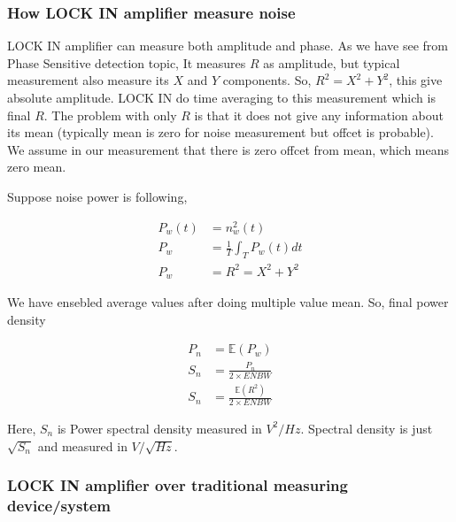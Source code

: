 \subsubsection{How LOCK IN amplifier measure noise}

LOCK IN amplifier can measure both amplitude and phase. As we have see from Phase Sensitive detection topic, It measures  $R$ as amplitude, but typical measurement also measure its $X$ and $Y$ components. So, $R^2=X^2+Y^2$, this give absolute amplitude. LOCK IN do time averaging to this measurement which is final $R$. The problem with only $R$ is that it does not give any information about its mean (typically mean is zero for noise measurement but offcet is probable). We assume in our measurement that there is zero offcet from mean, which means zero mean. \cite{zhistnoise}


Suppose noise power is following,

\begin{align*}
  P_w(t) & = n^2_w(t)\\
  P_w & = \frac{1}{T}\int_{T}P_w(t)dt\\
  P_w & = R^2 = X^2+Y^2
\end{align*}

We have ensebled average values after doing multiple value mean. So, final power density

\begin{align*}
  P_n & = \mathbb{E}({P_w})\\
  S_n & = \frac{P_n}{2\times ENBW}\\
  S_n & = \frac{\mathbb{E}(R^2)}{2 \times ENBW}
\end{align*}


Here, $S_n$ is Power spectral density measured in $V^2/Hz$. Spectral density is just $\sqrt{S_n}$ and measured in $V/\sqrt{Hz}$.

\subsubsection{LOCK IN amplifier over traditional measuring device/system}

